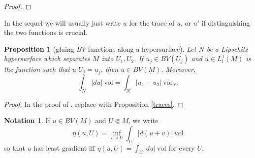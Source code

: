 \documentclass[reqno,12pt,letterpaper]{amsart}
\newcommand{\vol}{\mathrm{vol}}
\newtheorem{proposition}[theorem]{Proposition}
\theoremstyle{definition}
\newtheorem{notation}[theorem]{Notation}
\numberwithin{equation}{section}
\begin{document}
\begin{proof}
%
\end{proof}

In the sequel we will usually just write $u$ for the trace of $u$, or $u'$ if distinguishing the two functions is crucial.

\begin{proposition}[gluing $BV$ functions along a hypersurface]\label{gluing}
Let $N$ be a Lipschitz hypersurface which separates $M$ into $U_1,U_2$.
If $u_j \in BV(U_j)$ and $u \in L^1_l(M)$ is the function such that $u|U_j = u_j$, then $u \in BV(M)$.
Moreover,
\begin{equation}
\label{glued BV norm}
\int_N |du| ~\vol = \int_N |u_1 - u_2| ~\vol_N.
\end{equation}
\end{proposition}
\begin{proof}
In the proof of \cite[Teorema 2]{Miranda67}, replace \cite[Teorema 1]{Miranda67} with Proposition \ref{traces}.
\end{proof}

\begin{notation}
If $u \in BV(M)$ and $U \Subset M$, we write
$$\eta(u, U) = \inf_{v \prec U} \int_U |d(u+v)| ~\vol$$
so that $u$ has least gradient iff $\eta(u, U) = \int_U |du| ~\vol$ for every $U$.
\end{notation}
\end{document}
